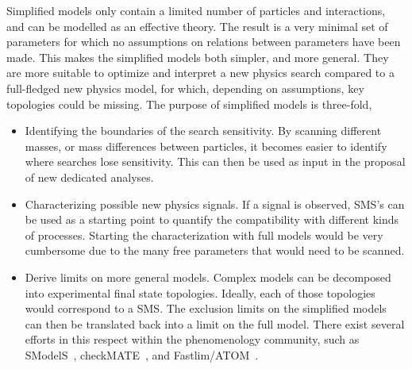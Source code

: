 Simplified models only contain a limited number of particles and interactions, and can be modelled
as an effective theory. 
The result is a very minimal set of parameters for which no assumptions on relations between
parameters have been made. This makes the simplified models both simpler, and more general.
They are more suitable to optimize and interpret a new physics search compared to a full-fledged
new physics model, for which, depending on assumptions, key topologies could be missing.
The purpose of simplified models is three-fold,
\begin{itemize}
  \item Identifying the boundaries of the search sensitivity. By scanning different masses, or mass
differences between particles, it becomes easier to identify where searches lose sensitivity. This
can then be used as input in the proposal of new dedicated analyses. 

  \item Characterizing possible new physics signals. If a signal is observed, SMS's can be used as
a starting point to quantify the compatibility with different kinds of processes. Starting the
characterization with full models would be very cumbersome due to the many free
parameters that would need to be scanned.

\item Derive limits on more general models. Complex models can be decomposed into experimental
final state topologies. Ideally, each of those topologies would correspond to a SMS. The exclusion
limits on the simplified models can then be translated back into a limit on the full model. There
exist several efforts in this respect within the phenomenology community, such as
SModelS~\cite{Kraml:2013mwa,Kraml:2014sna}, checkMATE~\cite{Kim:2015wza}, and
Fastlim/ATOM~\cite{Papucci:2014rja}.
\end{itemize}


